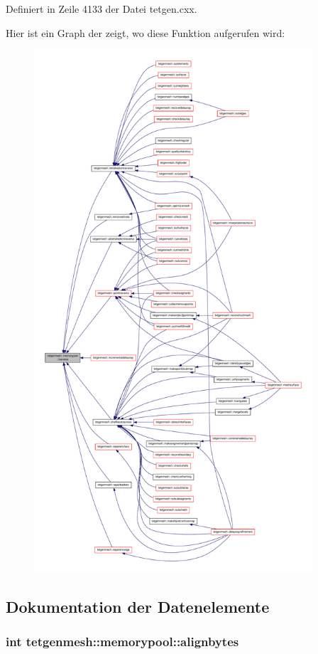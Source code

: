 Definiert in Zeile 4133 der Datei tetgen.\-cxx.



Hier ist ein Graph der zeigt, wo diese Funktion aufgerufen wird\-:
\nopagebreak
\begin{figure}[H]
\begin{center}
\leavevmode
\includegraphics[height=550pt]{classtetgenmesh_1_1memorypool_a151fe73459d0fa9a7262d0030fecf291_icgraph}
\end{center}
\end{figure}




\subsection{Dokumentation der Datenelemente}
\hypertarget{classtetgenmesh_1_1memorypool_a83ede6da644205f50ae359dc633a92a5}{
\subsubsection[{alignbytes}]{\setlength{\rightskip}{0pt plus 5cm}int tetgenmesh\-::memorypool\-::alignbytes}}\label{classtetgenmesh_1_1memorypool_a83ede6da644205f50ae359dc633a92a5}


